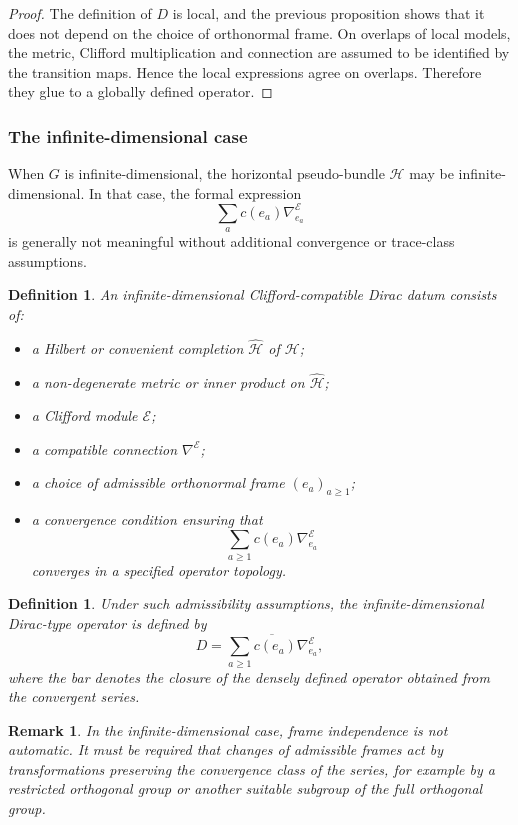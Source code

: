 \documentclass[11pt]{amsart}
\newtheorem{definition}[theorem]{Definition}
\newtheorem{remark}[theorem]{Remark}
\begin{document}
\begin{proof}
The definition of \(D\) is local, and the previous proposition shows that it
does not depend on the choice of orthonormal frame. On overlaps of local
models, the metric, Clifford multiplication and connection are assumed to be
identified by the transition maps. Hence the local expressions agree on
overlaps. Therefore they glue to a globally defined operator.
\end{proof}

\subsubsection{The infinite-dimensional case}

When \(G\) is infinite-dimensional, the horizontal pseudo-bundle
\(\mathcal H\) may be infinite-dimensional. In that case, the formal expression
\[
\sum_a c(e_a)\nabla^{\mathcal E}_{e_a}
\]
is generally not meaningful without additional convergence or trace-class
assumptions.

\begin{definition}
An infinite-dimensional Clifford-compatible Dirac datum consists of:
\begin{itemize}
\item a Hilbert or convenient completion \(\widehat{\mathcal H}\) of
\(\mathcal H\);
\item a non-degenerate metric or inner product on \(\widehat{\mathcal H}\);
\item a Clifford module \(\mathcal E\);
\item a compatible connection \(\nabla^{\mathcal E}\);
\item a choice of admissible orthonormal frame \((e_a)_{a\geq1}\);
\item a convergence condition ensuring that
\[
\sum_{a\geq1} c(e_a)\nabla^{\mathcal E}_{e_a}
\]
converges in a specified operator topology.
\end{itemize}
\end{definition}

\begin{definition}
Under such admissibility assumptions, the infinite-dimensional Dirac-type
operator is defined by
\[
D
=
\overline{\sum_{a\geq1} c(e_a)\nabla^{\mathcal E}_{e_a}},
\]
where the bar denotes the closure of the densely defined operator obtained
from the convergent series.
\end{definition}

\begin{remark}
In the infinite-dimensional case, frame independence is not automatic. It must
be required that changes of admissible frames act by transformations preserving
the convergence class of the series, for example by a restricted orthogonal
group or another suitable subgroup of the full orthogonal group.
\end{remark}
\end{document}
